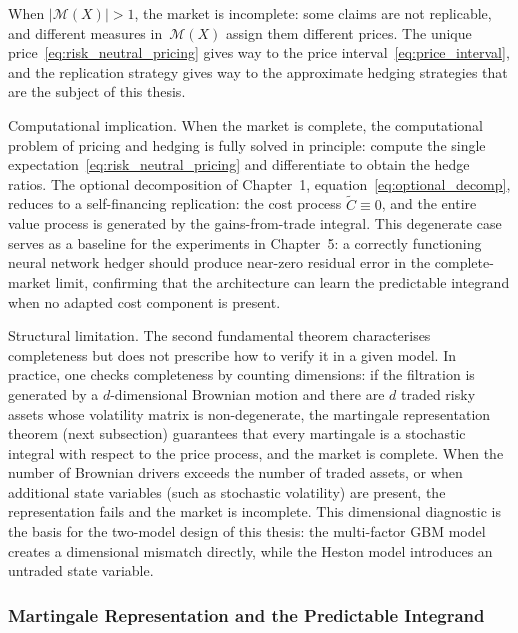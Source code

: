 When $|\mathcal{M}(X)| > 1$, the market is incomplete: some claims are
not replicable, and different measures in~$\mathcal{M}(X)$ assign them
different prices.  The unique price~\eqref{eq:risk_neutral_pricing}
gives way to the price interval~\eqref{eq:price_interval}, and the
replication strategy gives way to the approximate hedging strategies that
are the subject of this thesis.

\noindent Computational implication.
When the market is complete, the computational problem of pricing and
hedging is fully solved in principle: compute the single
expectation~\eqref{eq:risk_neutral_pricing} and differentiate to
obtain the hedge ratios.  The optional decomposition of
Chapter~1, equation~\eqref{eq:optional_decomp}, reduces to a
self-financing replication: the cost process $\tilde{C} \equiv 0$, and
the entire value process is generated by the gains-from-trade integral.
This degenerate case serves as a baseline for the experiments in
Chapter~5: a correctly functioning neural network hedger should produce
near-zero residual error in the complete-market limit, confirming that
the architecture can learn the predictable integrand when no adapted
cost component is present.

\noindent Structural limitation.
The second fundamental theorem characterises completeness but does not
prescribe how to verify it in a given model.  In practice, one checks
completeness by counting dimensions: if the filtration is generated by a
$d$-dimensional Brownian motion and there are $d$ traded risky assets
whose volatility matrix is non-degenerate, the martingale representation
theorem (next subsection) guarantees that every martingale is a stochastic
integral with respect to the price process, and the market is complete.
When the number of Brownian drivers exceeds the number of traded assets,
or when additional state variables (such as stochastic volatility) are
present, the representation fails and the market is incomplete.  This
dimensional diagnostic is the basis for the two-model design of this
thesis: the multi-factor GBM model creates a dimensional mismatch
directly, while the Heston model introduces an untraded state variable.


\subsubsection{Martingale Representation and the Predictable Integrand}
\label{sssec:mart_rep}

